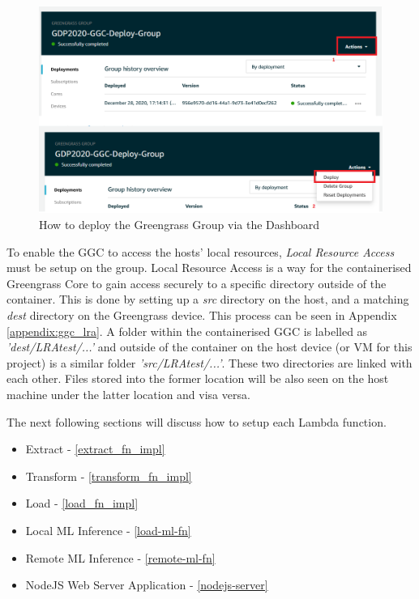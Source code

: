 \begin{figure}[ht]
    \centering
    \includegraphics[width=0.7\linewidth]{pages/Chapter4/Chapter 4 Images/deploy_group.png}
    \caption{How to deploy the Greengrass Group via the Dashboard}
    \label{fig:deploy_on_dashboard}
\end{figure}


To enable the GGC to access the hosts' local resources, \textit{Local Resource Access} must be setup on the group. Local Resource Access is a way for the containerised Greengrass Core to gain access securely to a specific directory outside of the container. This is done by setting up a \textit{src} directory on the host, and a matching \textit{dest} directory on the Greengrass device. This process can be seen in Appendix \ref{appendix:ggc_lra}. A folder within the containerised GGC is labelled as \textit{'dest/LRAtest/...'} and outside of the container on the host device (or VM for this project) is a similar folder \textit{'src/LRAtest/...'}. These two directories are linked with each other. Files stored into the former location will be also seen on the host machine under the latter location and visa versa.

The next following sections will discuss how to setup each Lambda function.
\begin{itemize}
    \item Extract - \ref{extract_fn_impl}
    \item Transform - \ref{transform_fn_impl}
    \item Load - \ref{load_fn_impl}
    \item Local ML Inference - \ref{load-ml-fn}
    \item Remote ML Inference - \ref{remote-ml-fn}
    \item NodeJS Web Server Application - \ref{nodejs-server}
\end{itemize}


